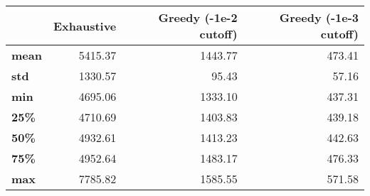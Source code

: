 \begin{tabular}{lrrr}
\toprule
{} &  Exhaustive &  Greedy (-1e-2 cutoff) &  Greedy (-1e-3 cutoff) \\
\midrule
\textbf{mean} &     5415.37 &                1443.77 &                 473.41 \\
\textbf{std } &     1330.57 &                  95.43 &                  57.16 \\
\textbf{min } &     4695.06 &                1333.10 &                 437.31 \\
\textbf{25\% } &     4710.69 &                1403.83 &                 439.18 \\
\textbf{50\% } &     4932.61 &                1413.23 &                 442.63 \\
\textbf{75\% } &     4952.64 &                1483.17 &                 476.33 \\
\textbf{max } &     7785.82 &                1585.55 &                 571.58 \\
\bottomrule
\end{tabular}
